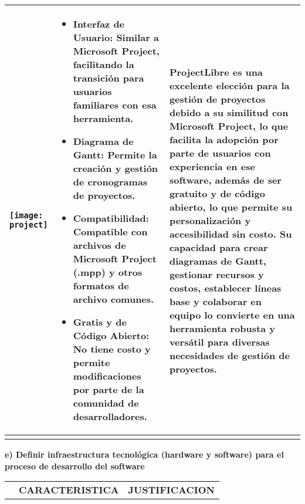 \begin{doublespace}
\begin{enumerate}[label=\alph*)]
\begin{longtable}{|p{3cm}|p{6cm}|p{6cm}|}
    \raisebox{-\totalheight}{\texttt{[image: \\project]}} & 
    \begin{itemize}
        \item Interfaz de Usuario: Similar a Microsoft Project, facilitando la transición para
        usuarios familiares con esa herramienta.
        \item Diagrama de Gantt: Permite la creación y gestión de cronogramas de proyectos.
        \item Compatibilidad: Compatible con archivos de Microsoft Project (.mpp) y otros
        formatos de archivo comunes.
        \item Gratis y de Código Abierto: No tiene costo y permite modificaciones por parte de
        la comunidad de desarrolladores.

    \end{itemize} & 
    ProjectLibre es una excelente elección para la gestión de proyectos debido a su similitud
con Microsoft Project, lo que facilita la adopción por parte de usuarios con experiencia en ese
software, además de ser gratuito y de código abierto, lo que permite su personalización y
accesibilidad sin costo. Su capacidad para crear diagramas de Gantt, gestionar recursos y costos,
establecer líneas base y colaborar en equipo lo convierte en una herramienta robusta y versátil
para diversas necesidades de gestión de proyectos.\\
    \hline

            \hline
            \rowcolor{bleudefrance} \multicolumn{3}{c|}{} \\
            \hline
            
            \end{longtable}
    \textbf{e) Definir infraestructura tecnológica (hardware y software) para el proceso de desarrollo del software}
   
    




       
        \begin{longtable}{|p{3cm}|p{6cm}|p{6cm}|}
            \hline
            \rowcolor{bleudefrance}
        
            \multicolumn{3}{c|}{\color{aliceblue}\Large\textbf{Lenguaje de Programación: Python}}\\
            \hline
            \rowcolor{bleudefrance} \color{aliceblue}{ \textbf{Logo}} & \color{aliceblue}\textbf{CARACTERISTICA} & \color{aliceblue}\textbf{JUSTIFICACION} \\
            \hline
            \endfirsthead
            

\end{longtable}
\end{enumerate}
\end{doublespace}
